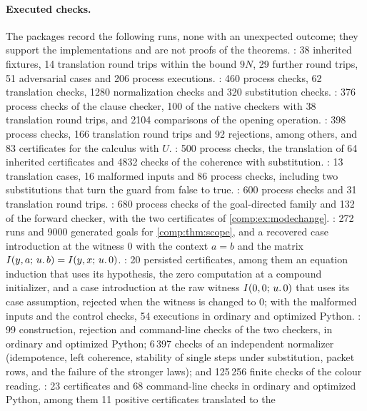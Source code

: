 \paragraph{Executed checks.}
The packages record the following runs, none with an unexpected outcome;
they support the implementations and are not proofs of the theorems.
: 38 inherited fixtures, 14 translation round
trips within the bound $9N$, 29 further round trips, 51 adversarial cases
and 206 process executions. : 460 process
checks, 62 translation checks, 1280 normalization checks and 320
substitution checks. : 376 process checks of the clause
checker, 100 of the native checkers with 38 translation round trips, and
2104 comparisons of the opening operation. : 398
process checks, 166 translation round trips and 92 rejections, among
others, and 83 certificates for the calculus with $U$.
: 500 process checks, the translation of 64 inherited
certificates and 4832 checks of the coherence with substitution.
: 13 translation cases, 16 malformed inputs and 86
process checks, including two substitutions that turn the guard from false
to true. : 600 process checks and 31 translation
round trips. : 680 process checks of the
goal-directed family and 132 of the forward checker, with the two
certificates of \cref{comp:ex:modechange}. : 272
runs and 9000 generated goals for \cref{comp:thm:scope}, and a recovered
case introduction at the witness $0$ with the context $a=b$ and the matrix
$I(y,a;\,u.\,b)=I(y,x;\,u.\,0)$. : 20
persisted certificates, among them an equation induction that uses its
hypothesis, the zero computation at a compound initializer, and a case
introduction at the raw witness $I(0,0;\,u.\,0)$ that uses its case
assumption, rejected when the witness is changed to $0$; with the
malformed inputs and the control checks, 54 executions in ordinary and
optimized Python. : 99 construction, rejection and
command-line checks of the two checkers, in ordinary and optimized Python;
6\,397 checks of an independent normalizer (idempotence, left coherence,
stability of single steps under substitution, packet rows, and the failure
of the stronger laws); and 125\,256 finite checks of the colour reading.
: 23 certificates and 68 command-line checks in ordinary
and optimized Python, among them 11 positive certificates translated to the
